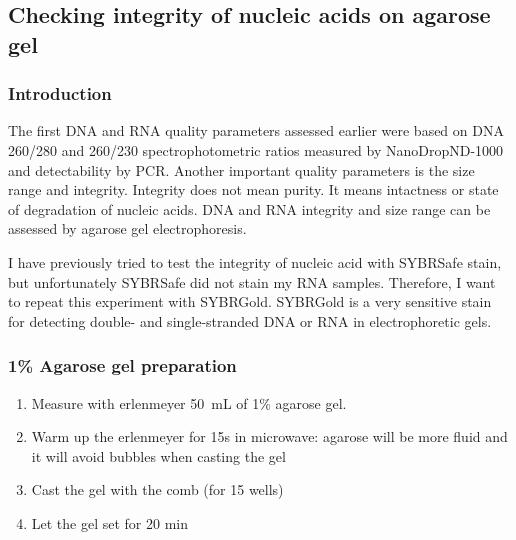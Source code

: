 \subsection{Checking integrity of nucleic acids on agarose gel}
\label{task:20180315_cj2}

\subsubsection{Introduction}

The first DNA and RNA quality parameters assessed earlier were based on DNA 260/280 and 260/230 spectrophotometric ratios measured by NanoDrop\cR ND-1000 and detectability by PCR. Another important quality parameters is the size range and integrity. Integrity does not mean purity. It means intactness or state of degradation of nucleic acids. DNA and RNA integrity and size range can be assessed by agarose gel electrophoresis.

I have previously tried to test the integrity of nucleic acid with SYBR\cR Safe stain, but unfortunately SYBR\cR Safe did not stain my RNA samples. Therefore, I want to repeat this experiment with SYBR\cR Gold. SYBR\cR Gold is a very sensitive stain for detecting double- and single-stranded DNA or RNA in electrophoretic gels. 

\subsubsection{1\% Agarose gel preparation}

\begin{enumerate}
\item Measure with erlenmeyer 50~mL of 1\% agarose gel.
\item Warm up the erlenmeyer for 15s in microwave: agarose will be more fluid and it will avoid bubbles when casting the gel
\item Cast the gel with the comb (for 15 wells)
\item Let the gel set for 20 min
\end{enumerate}

